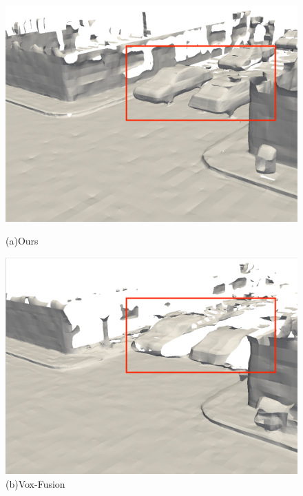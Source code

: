 \begin{figure}[htbp]
\begin{minipage}{0.5\linewidth}
    \includegraphics[width=1\linewidth]{figures/mai_2_vox.png}
    \caption*{(a)Ours}
\end{minipage}\hfill
\begin{minipage}{0.5\linewidth}
    \centering
    \includegraphics[width=1\linewidth]{figures/mai_2_bce.png}
    \caption*{(b)Vox-Fusion}
\end{minipage}
\end{figure}

